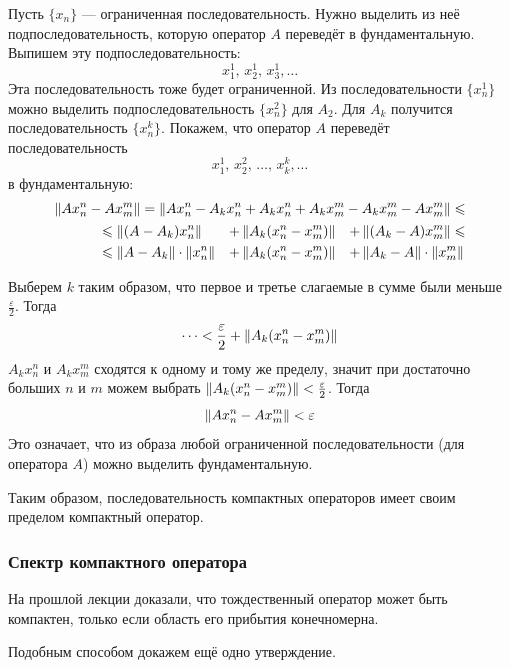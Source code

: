 \documentclass[12pt]{article}
\begin{document}
\begin{enumerate}
				Пусть $\{x_n\}$ --- ограниченная последовательность. Нужно выделить из неё подпоследовательность, которую оператор $A$ 
				переведёт в фундаментальную. Выпишем эту подпоследовательность:
				$$x_1^1,\,x_2^1,\,x_3^1,\dots$$
				Эта последовательность тоже будет ограниченной. Из последовательности $\{x^1_n\}$ можно выделить подпоследовательность 
				$\{x^2_n\}$ для $A_2$. Для $A_k$ получится последовательность $\{x^k_n\}$. Покажем, что оператор $A$ переведёт 
				последовательность
				$$x^1_1,\,x^2_2,\,\dots,\,x^k_k,\dots$$
				в фундаментальную:
				\begin{align*}
					\left\| Ax_n^n - Ax_m^m \right\| = \left\| Ax_n^n - A_kx^n_n + A_kx_n^n + A_kx_m^m - A_kx_m^m - Ax_m^m \right\| \leqslant \\
					\begin{aligned}
						&\leqslant \left\| (A-A_k)x_n^n \right\| &+ &\left\| A_k(x_n^n - x_m^m) \right\| &+ &\left\| (A_k - A)x_m^m \right\| \leqslant \\
						&\leqslant \left\| A-A_k \right\|\cdot\left\| x_n^n \right\| &+ &\left\| A_k(x_n^n - x_m^m) \right\| &+ &\left\| A_k - A \right\| \cdot\left\| x_m^m \right\|
					\end{aligned}
				\end{align*}
		
				Выберем $k$ таким образом, что первое и третье слагаемые в сумме были меньше $\frac{\varepsilon}{2}$. Тогда 
				$$\dots < \frac{\varepsilon}{2} + \left\| A_k(x_n^n - x_m^m) \right\|$$
				$A_k x_n^n$ и $A_k x_m^m$ сходятся к одному и тому же пределу, значит при достаточно больших $n$ и $m$ можем выбрать
				$\left\| A_k(x_n^n - x_m^m) \right\| < \frac{\varepsilon}{2}$. Тогда
				$$\left\| Ax_n^n - Ax_m^m \right\| < \varepsilon$$
				Это означает, что из образа любой ограниченной последовательности (для оператора $A$) можно выделить фундаментальную.
		
				Таким образом, последовательность компактных операторов имеет своим пределом компактный оператор.
			\end{enumerate}


		\subsubsection{Спектр компактного оператора}

			На прошлой лекции доказали, что тождественный оператор может быть компактен, только если область его прибытия конечномерна.

			Подобным способом докажем ещё одно утверждение.
	
\end{document}
